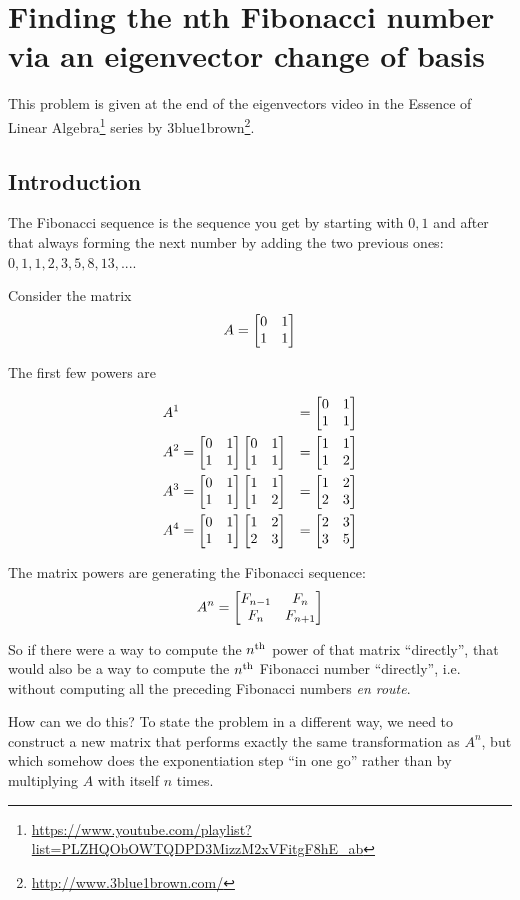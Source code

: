 \section{Finding the nth Fibonacci number via an eigenvector change of basis}


This problem is given at the end of the eigenvectors video in the Essence of Linear
Algebra\footnote{\url{https://www.youtube.com/playlist?list=PLZHQObOWTQDPD3MizzM2xVFitgF8hE_ab}} series by 3blue1brown\footnote{\url{http://www.3blue1brown.com/}}.


\subsection*{Introduction}

The Fibonacci sequence is the sequence you get by starting with $0, 1$ and after that always
forming the next number by adding the two previous ones: $0, 1, 1, 2, 3, 5, 8, 13, ...$.

Consider the matrix
\[
A = \begin{bmatrix}0 & 1\\1 & 1\\ \end{bmatrix}
\]

The first few powers are

\begin{align*}
&A^{1} &= \begin{bmatrix}0 & 1\\1 & 1\\ \end{bmatrix}
\\
&A^{2} = \begin{bmatrix}0 & 1\\1 & 1\\ \end{bmatrix} \begin{bmatrix}0 & 1\\1 & 1\\ \end{bmatrix} &= \begin{bmatrix}1 & 1\\1 & 2\\ \end{bmatrix}
\\
&A^{3} = \begin{bmatrix}0 & 1\\1 & 1\\ \end{bmatrix} \begin{bmatrix}1 & 1\\1 & 2\\ \end{bmatrix} &= \begin{bmatrix}1 & 2\\2 & 3\\ \end{bmatrix}
\\
&A^{4} = \begin{bmatrix}0 & 1\\1 & 1\\ \end{bmatrix} \begin{bmatrix}1 & 2\\2 & 3\\ \end{bmatrix} &= \begin{bmatrix}2 & 3\\3 & 5\\ \end{bmatrix}
\end{align*}

The matrix powers are generating the Fibonacci sequence:
\begin{align*}
  A^{n} = \begin{bmatrix}F_{n-1}  & F_n      \\F_n      & F_{n+1} \\ \end{bmatrix}
\end{align*}


So if there were a way to compute the $n^{\text{th}}$ power of that matrix ``directly'',
that would also be a way to compute the $n^{\text{th}}$ Fibonacci number ``directly'',
i.e. without computing all the preceding Fibonacci numbers \textit{en route}.

How can we do this? To state the problem in a different way, we need to
construct a new matrix that performs exactly the same transformation as $A^n$,
but which somehow does the exponentiation step ``in one go'' rather than by
multiplying $A$ with itself $n$ times.

